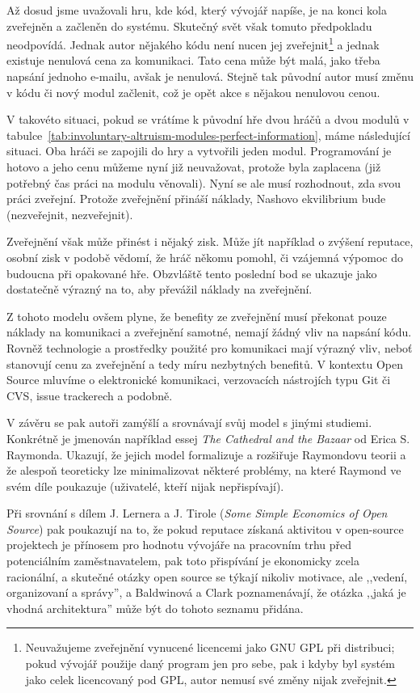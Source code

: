 \begin{multicols}{2}
		Až dosud jsme uvažovali hru, kde kód, který vývojář napíše, je na konci kola zveřejněn a začleněn do systému. Skutečný svět však tomuto předpokladu neodpovídá. Jednak autor nějakého kódu není nucen jej zveřejnit\footnote{Neuvažujeme zveřejnění vynucené licencemi jako GNU GPL při distribuci; pokud vývojář použije daný program jen pro sebe, pak i kdyby byl systém jako celek licencovaný pod GPL, autor nemusí své změny nijak zveřejnit.} a jednak existuje nenulová cena za komunikaci. Tato cena může být malá, jako třeba napsání jednoho e-mailu, avšak je nenulová. Stejně tak původní autor musí změnu v kódu či nový modul začlenit, což je opět akce s nějakou nenulovou cenou.

		V takovéto situaci, pokud se vrátíme k původní hře dvou hráčů a dvou modulů v tabulce~\ref{tab:involuntary-altruism-modules-perfect-information}, máme následující situaci. Oba hráči se zapojili do hry a vytvořili jeden modul. Programování je hotovo a jeho cenu můžeme nyní již neuvažovat, protože byla zaplacena (již potřebný čas práci na modulu věnovali). Nyní se ale musí rozhodnout, zda svou práci zveřejní. Protože zveřejnění přináší náklady, Nashovo ekvilibrium bude (nezveřejnit, nezveřejnit).

		Zveřejnění však může přinést i nějaký zisk. Může jít například o zvýšení reputace, osobní zisk v podobě vědomí, že hráč někomu pomohl, či vzájemná výpomoc do budoucna při opakované hře. Obzvláště tento poslední bod se ukazuje jako dostatečně výrazný na to, aby převážil náklady na zveřejnění.

		Z tohoto modelu ovšem plyne, že benefity ze zveřejnění musí překonat pouze náklady na komunikaci a zveřejnění samotné, nemají žádný vliv na napsání kódu. Rovněž technologie a prostředky použité pro komunikaci mají výrazný vliv, neboť stanovují cenu za zveřejnění a tedy míru nezbytných benefitů. V kontextu Open Source mluvíme o elektronické komunikaci,  verzovacích nástrojích typu Git či CVS, issue trackerech a podobně.

		V závěru se pak autoři zamýšlí a srovnávají svůj model s jinými studiemi. Konkrétně je jmenován například essej {\em The Cathedral and the Bazaar} od Erica S. Raymonda. Ukazují, že jejich model formalizuje a rozšiřuje Raymondovu teorii a že alespoň teoreticky lze minimalizovat některé problémy, na které Raymond ve svém díle poukazuje (uživatelé, kteří nijak nepřispívají).

	 	Při srovnání s dílem J. Lernera a J. Tirole ({\em Some Simple Economics of Open Source}) pak poukazují na to, že pokud reputace získaná aktivitou v open-source projektech je přínosem pro hodnotu vývojáře na pracovním trhu před potenciálním zaměstnavatelem, pak toto přispívání je ekonomicky zcela racionální, a skutečné otázky open source se týkají nikoliv motivace, ale ,,vedení, organizovaní a správy'', a Baldwinová a Clark poznamenávají, že otázka ,,jaká je vhodná architektura'' může být do tohoto seznamu přidána.



\end{multicols}
